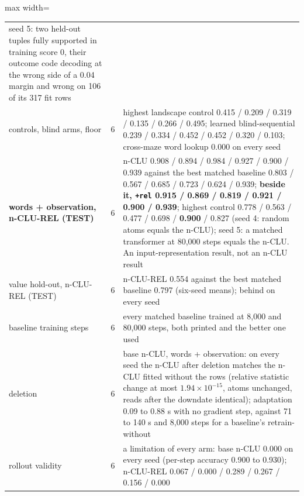 \documentclass{article} %
\newcommand{\sci}[2]{\ensuremath{#1\times10^{#2}}}
\begin{document}
\begin{table}[h]
\begin{adjustbox}{max width=\linewidth}
\begin{tabular}{p{2.2cm}p{0.6cm}p{10.3cm}}
seed 5: two held-out tuples fully supported in training score 0, their outcome code decoding at the wrong side of a 0.04 margin and wrong on 106 of its 317 fit rows \\ %
\quad controls, blind arms, floor & 6 & highest landscape control 0.415 / 0.209 / 0.319 / 0.135 / 0.266 / 0.495; learned blind-sequential 0.239 / 0.334 / 0.452 / 0.452 / 0.320 / 0.103; cross-maze word lookup 0.000 on every seed \\
\textbf{words + observation, n-CLU-REL (TEST)} & 6 & n-CLU 0.908 / 0.894 / 0.984 / 0.927 / 0.900 / 0.939 against the best matched baseline 0.803 / 0.567 / 0.685 / 0.723 / 0.624 / 0.939; \textbf{beside it, \texttt{+rel} 0.915 / 0.869 / 0.819 / 0.921 / 0.900 / 0.939}; highest control 0.778 / 0.563 / 0.477 / 0.698 / \textbf{0.900} / 0.827 (seed 4: random atoms equals the n-CLU); seed 5: a matched transformer at 80,000 steps equals the n-CLU. An input-representation result, not an n-CLU result \\
\quad value hold-out, n-CLU-REL (TEST) & 6 & n-CLU-REL 0.554 against the best matched baseline 0.797 (six-seed means); behind on every seed \\ %
\midrule
baseline training steps & 6 & every matched baseline trained at 8,000 and 80,000 steps, both printed and the better one used \\
deletion & 6 & base n-CLU, words + observation: on every seed the n-CLU after deletion matches the n-CLU fitted without the rows (relative statistic change at most \sci{1.94}{-15}, atoms unchanged, reads after the downdate identical); adaptation 0.09 to 0.88 s with no gradient step, against 71 to 140 s and 8,000 steps for a baseline's retrain-without \\
rollout validity & 6 & a limitation of every arm: base n-CLU 0.000 on every seed (per-step accuracy 0.900 to 0.930); n-CLU-REL 0.067 / 0.000 / 0.289 / 0.267 / 0.156 / 0.000 \\
\bottomrule
\end{tabular}\end{adjustbox}
\end{table}
\end{document}
